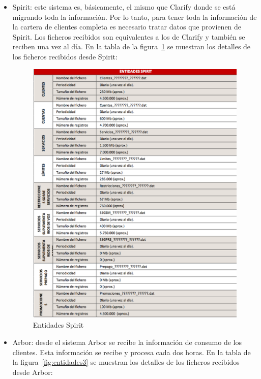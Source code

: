 \documentclass[a4paper, 12pt]{book}
\begin{document}
\begin{itemize}
	\item Spirit: este sistema es, básicamente, el mismo que Clarify donde se está migrando toda la información. Por lo tanto, para tener toda la información de la cartera de clientes completa es necesario tratar datos que provienen de Spirit. Los ficheros recibidos son equivalentes a los de Clarify y también se reciben una vez al día. En la tabla de la figura~\ref{fig:entidades2} se muestran los detalles de los ficheros recibidos desde Spirit:

	\begin{figure}
	  \centering
	  \includegraphics[width=14cm, keepaspectratio]{img/entidades2}
	  \caption{Entidades Spirit}
	  \label{fig:entidades2}
	\end{figure}
	
	\item Arbor: desde el sistema Arbor se recibe la información de consumo de los clientes. Esta información se recibe y procesa cada dos horas. En la tabla de la figura~\ref{fig:entidades3} se muestran los detalles de los ficheros recibidos desde Arbor:


\end{itemize}
\end{document}
